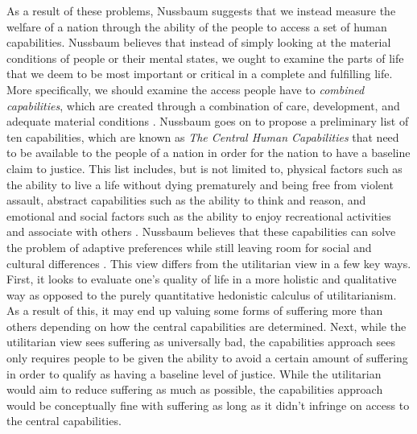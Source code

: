 \documentclass[12pt]{article}
\begin{document}
As a result of these problems, Nussbaum suggests that we instead measure the welfare of a nation through the ability of the people to access a set of human capabilities.
Nussbaum believes that instead of simply looking at the material conditions of people or their mental states, we ought to examine the parts of life that we deem to be most important or critical in a complete and fulfilling life.
More specifically, we should examine the access people have to \emph{combined capabilities}, which are created through a combination of care, development, and adequate material conditions \autocite[240]{nussbaum2019}.
Nussbaum goes on to propose a preliminary list of ten capabilities, which are known as \emph{The Central Human Capabilities} that need to be available to the people of a nation in order for the nation to have a baseline claim to justice.
This list includes, but  is not limited to, physical factors such as the ability to live a life without dying prematurely and being free from violent assault, abstract capabilities such as the ability to think and reason, and emotional and social factors such as the ability to enjoy recreational activities and associate with others \autocite[242]{nussbaum2019}.
Nussbaum believes that these capabilities can solve the problem of adaptive preferences while still leaving room for social and cultural differences \autocite[243]{nussbaum2019}.
This view differs from the utilitarian view in a few key ways.
First, it looks to evaluate one's quality of life in a more holistic and qualitative way as opposed to the purely quantitative hedonistic calculus of utilitarianism.
As a result of this, it may end up valuing some forms of suffering more than others depending on how the central capabilities are determined.
Next, while the utilitarian view sees suffering as universally bad, the capabilities approach sees only requires people to be given the ability to avoid a certain amount of suffering in order to qualify as having a baseline level of justice.
While the utilitarian would aim to reduce suffering as much as possible, the capabilities approach would be conceptually fine with suffering as long as it didn't infringe on access to the central capabilities.
\end{document}
